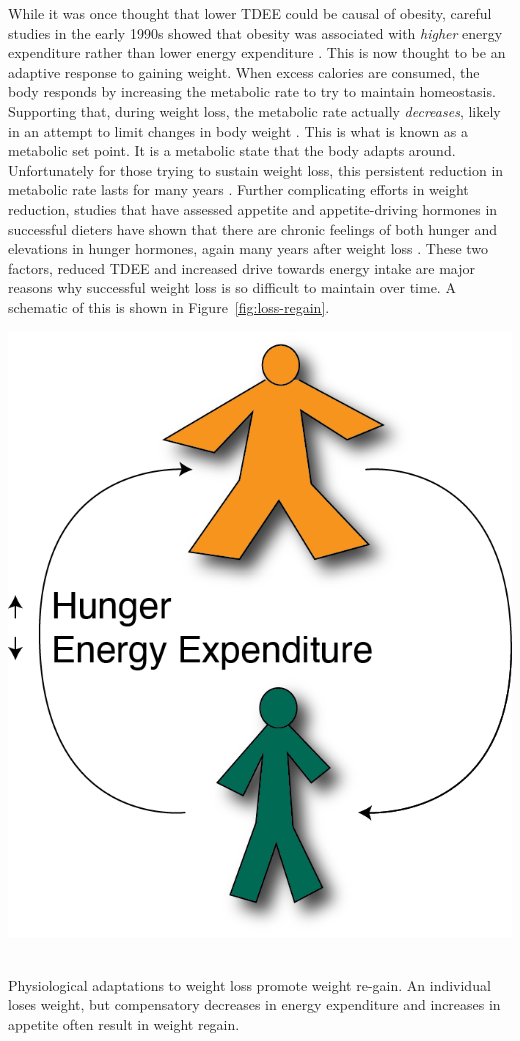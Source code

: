 \documentclass{tufte-handout}
\begin{document}
While it was once thought that lower TDEE could be causal of obesity, careful studies in the early 1990s showed that obesity was associated with \emph{higher} energy expenditure rather than lower energy expenditure \citep{Ravussin1982}.  This is now thought to be an adaptive response to gaining weight.  When excess calories are consumed, the body responds by increasing the metabolic rate to try to maintain homeostasis.  Supporting that, during weight loss, the metabolic rate actually \emph{decreases}, likely in an attempt to limit changes in body weight \citep{Leibel1995a}.  This is what is known as a metabolic set point.  It is a metabolic state that the body adapts around.  Unfortunately for those trying to sustain weight loss, this persistent reduction in metabolic rate lasts for many years \citep{Rosenbaum2008}.  Further complicating efforts in weight reduction, studies that have assessed appetite and appetite-driving hormones in successful dieters have shown that there are chronic feelings of both hunger and elevations in hunger hormones, again many years after weight loss \citep{Sumithran2011}.  These two factors, reduced TDEE and increased drive towards energy intake are major reasons why successful weight loss is so difficult to maintain over time.  A schematic of this is shown in Figure~\ref{fig:loss-regain}.

\begin{marginfigure}
\includegraphics{figures/Loss-Regain.png}\
\caption{Physiological adaptations to weight loss promote weight re-gain.  An individual loses weight, but compensatory decreases in energy expenditure and increases in appetite often result in weight regain.}\label{fig:loss-regain}
\end{marginfigure}




\end{document}
